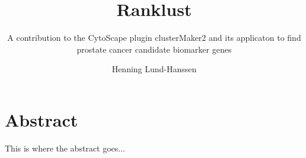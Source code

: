 \documentclass[UKenglish]{ifimaster}
\title{Ranklust}
\subtitle{A contribution to the CytoScape plugin clusterMaker2 and its applicaton to find prostate cancer candidate biomarker genes}
\author{Henning Lund-Hanssen}
\begin{document}
\setlength{\parskip}{12pt}
\setlength{\parindent}{12pt}

\ififorside{}
\frontmatter{}
\maketitle{}

\chapter*{Abstract}
This is where the abstract goes...

\tableofcontents{}
\listoffigures{}
\listoftables{}

\mainmatter{}










\backmatter{}
\printbibliography
\end{document}

